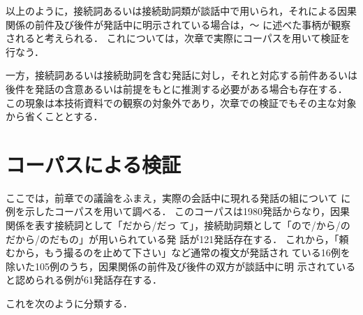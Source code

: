 以上のように，接続詞あるいは接続助詞類が談話中で用いられ，それによる因果
関係の前件及び後件が発話中に明示されている場合は，〜
に述べた事柄が観察されると考えられる．
これについては，次章で実際にコーパスを用いて検証を行なう．

一方，接続詞あるいは接続助詞を含む発話に対し，それと対応する前件あるいは
後件を発話の含意あるいは前提をもとに推測する必要がある場合も存在する．
この現象は本技術資料での観察の対象外であり，次章での検証でもその主な対象
から省くこととする．

\section{コーパスによる検証}

ここでは，前章での議論をふまえ，実際の会話中に現れる発話の組について
に例を示したコーパスを用いて調べる．
このコーパスは1980発話からなり，因果関係を表す接続詞として「だから/だっ
て」，接続助詞類として「ので/から/のだから/のだもの」が用いられている発
話が121発話存在する．
これから，「頼むから，もう撮るのを止めて下さい」など通常の複文が発話され
ている16例を除いた105例のうち，因果関係の前件及び後件の双方が談話中に明
示されていると認められる例が61発話存在する．

これを次のように分類する．

